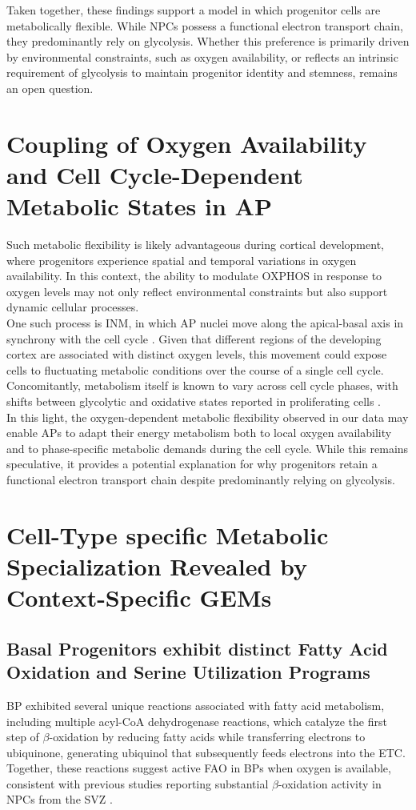 Taken together, these findings support a model in which progenitor cells are metabolically flexible. While NPCs possess a functional electron transport chain, they predominantly rely on glycolysis. Whether this preference is primarily driven by environmental constraints, such as oxygen availability, or reflects an intrinsic requirement of glycolysis to maintain progenitor identity and stemness, remains an open question. 


\section{Coupling of Oxygen Availability and Cell Cycle-Dependent Metabolic States in AP}
Such metabolic flexibility is likely advantageous during cortical development, where progenitors experience spatial and temporal variations in oxygen availability. In this context, the ability to modulate OXPHOS in response to oxygen levels may not only reflect environmental constraints but also support dynamic cellular processes. 
\\

One such process is INM, in which AP nuclei move along the apical-basal axis in synchrony with the cell cycle \citep{grosseCellDynamicsFetal2011}.
Given that different regions of the developing cortex are associated with distinct oxygen levels, this movement could expose cells to fluctuating metabolic conditions over the course of a single cell cycle. Concomitantly, metabolism itself is known to vary across cell cycle phases, with shifts between glycolytic and oxidative states reported in proliferating cells \citep{zylstraMetabolicDynamicsCell2022,liuSkp2DictatesCell2021}.
\\


In this light, the oxygen-dependent metabolic flexibility observed in our data may enable APs to adapt their energy metabolism both to local oxygen availability and to phase-specific metabolic demands during the cell cycle. While this remains speculative, it provides a potential explanation for why progenitors retain a functional electron transport chain despite predominantly relying on glycolysis. 

\section{Cell-Type specific Metabolic Specialization Revealed by Context-Specific GEMs}
\subsection{Basal Progenitors exhibit distinct Fatty Acid Oxidation and Serine Utilization Programs}
BP  exhibited several unique reactions associated with fatty acid metabolism, including multiple acyl-CoA dehydrogenase reactions, which catalyze the first step of $\beta$-oxidation by reducing fatty acids while transferring electrons to ubiquinone, generating ubiquinol that subsequently feeds electrons into the ETC. Together, these reactions suggest active FAO in BPs when oxygen is available, consistent with previous studies reporting substantial $\beta$-oxidation activity in NPCs from the SVZ \citep{STOLLNeuralStemCells2015}.
\\

